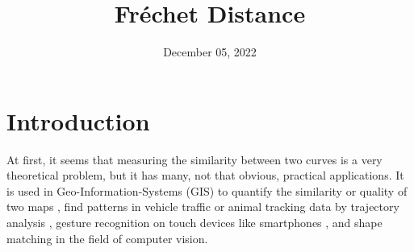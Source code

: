 \documentclass[
oneside,
fontsize=11pt
]{scrartcl}
\title{Fréchet Distance}
\date{December 05, 2022}
\begin{document}


%






\newpage

 




\section{Introduction}
At first, it seems that measuring the similarity between two curves
is a very theoretical problem, but it has many, not that obvious, practical applications.
It is used in Geo-Information-Systems (GIS) to 
quantify the similarity or quality of two maps \cite{lyu_partial-frechet-distance-based_2022},
find patterns in vehicle traffic or animal tracking data 
by trajectory analysis \cite{buchin_detecting_2011},
gesture recognition on touch devices like smartphones \cite{hu_research_2022},
and shape matching in the field of computer vision. 
\end{document}
